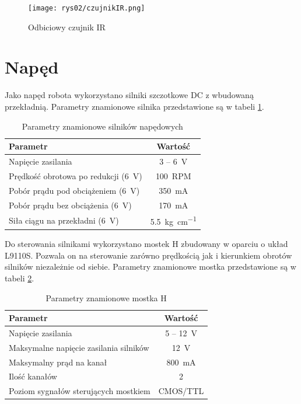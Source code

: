 		\begin{figure}[ht]
			\centering
			\texttt{[image: rys02/czujnikIR.png]} 
			\caption{Odbiciowy czujnik IR}
			\label{fig:czujnikIR}
		\end{figure}
	
	\section{Napęd}
		Jako napęd robota wykorzystano silniki szczotkowe DC z wbudowaną przekładnią. Parametry znamionowe silnika przedstawione są w tabeli \ref{tab:Napęd}.
		
		\begin{table}[ht]
			\centering
			\begin{tabular}{|l|c|} \hline
				\textbf{Parametr} & \textbf{Wartość} \\
				\hline
				\hline  Napięcie zasilania & 3 -- \SI{6}{\volt}  \\
				\hline 	Prędkość obrotowa po redukcji (\SI{6}{\volt})& \SI{100}{RPM} \\
				\hline 	Pobór prądu pod obciążeniem (\SI{6}{\volt})& \SI{350}{\mA} \\
				\hline 	Pobór prądu bez obciążenia (\SI{6}{\volt})& \SI{170}{\mA} \\
				\hline  Siła ciągu na przekładni (\SI{6}{\volt})& \SI[per-mode=symbol]{5,5}{\kg\per\cm} \\
				\hline
			\end{tabular}
			\caption{Parametry znamionowe silników napędowych}
			\label{tab:Napęd}
		\end{table}
	
		Do sterowania silnikami wykorzystano mostek H zbudowany w oparciu o układ L9110S. Pozwala on na sterowanie zarówno prędkością jak i kierunkiem obrotów silników niezależnie od siebie. Parametry znamionowe mostka przedstawione są w tabeli \ref{tab:MostekH}.
		
		\begin{table}[ht]
			\centering
			\begin{tabular}{|l|c|} \hline
				\textbf{Parametr} & \textbf{Wartość} \\
				\hline
				\hline  Napięcie zasilania & 5 -- \SI{12}{\volt}  \\
				\hline 	Maksymalne napięcie zasilania silników & \SI{12}{\volt} \\
				\hline 	Maksymalny prąd na kanał & \SI{800}{\mA} \\
				\hline 	Ilość kanałów & 2 \\
				\hline 	Poziom sygnałów sterujących mostkiem & CMOS/TTL \\
				\hline
			\end{tabular}
			\caption{Parametry znamionowe mostka H}
			\label{tab:MostekH}
		\end{table}
	
